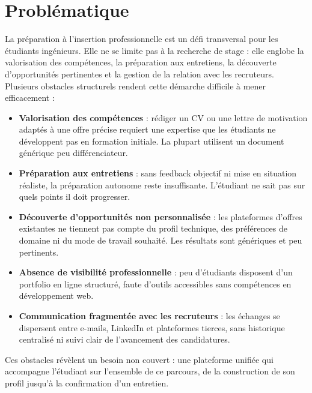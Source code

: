 ﻿\documentclass[12pt,a4paper]{report}
\begin{document}
\section{Problématique}

La préparation à l'insertion professionnelle est un défi transversal pour les étudiants ingénieurs. Elle ne se limite pas à la recherche de stage : elle englobe la valorisation des compétences, la préparation aux entretiens, la découverte d'opportunités pertinentes et la gestion de la relation avec les recruteurs. Plusieurs obstacles structurels rendent cette démarche difficile à mener efficacement :

\begin{itemize}
  \item \textbf{Valorisation des compétences} : rédiger un CV ou une lettre de motivation adaptés à une offre précise requiert une expertise que les étudiants ne développent pas en formation initiale. La plupart utilisent un document générique peu différenciateur.
  \item \textbf{Préparation aux entretiens} : sans feedback objectif ni mise en situation réaliste, la préparation autonome reste insuffisante. L'étudiant ne sait pas sur quels points il doit progresser.
  \item \textbf{Découverte d'opportunités non personnalisée} : les plateformes d'offres existantes ne tiennent pas compte du profil technique, des préférences de domaine ni du mode de travail souhaité. Les résultats sont génériques et peu pertinents.
  \item \textbf{Absence de visibilité professionnelle} : peu d'étudiants disposent d'un portfolio en ligne structuré, faute d'outils accessibles sans compétences en développement web.
  \item \textbf{Communication fragmentée avec les recruteurs} : les échanges se dispersent entre e-mails, LinkedIn et plateformes tierces, sans historique centralisé ni suivi clair de l'avancement des candidatures.
\end{itemize}

Ces obstacles révèlent un besoin non couvert : une plateforme unifiée qui accompagne l'étudiant sur l'ensemble de ce parcours, de la construction de son profil jusqu'à la confirmation d'un entretien.

\end{document}
